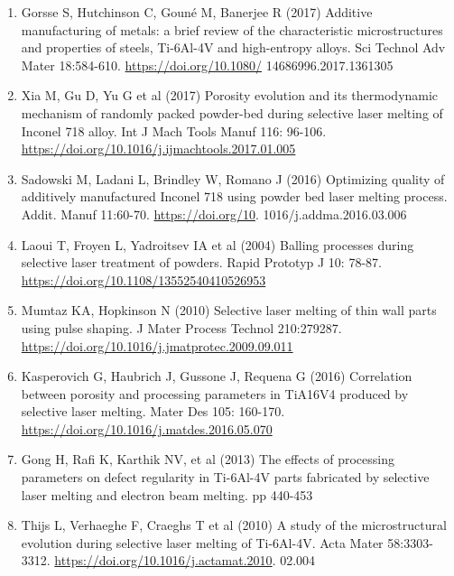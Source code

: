 \documentclass[10pt]{article}
\begin{document}
\begin{enumerate}
  \item Gorsse S, Hutchinson C, Gouné M, Banerjee R (2017) Additive manufacturing of metals: a brief review of the characteristic microstructures and properties of steels, Ti-6Al-4V and high-entropy alloys. Sci Technol Adv Mater 18:584-610. \href{https://doi.org/10.1080/}{https://doi.org/10.1080/} 14686996.2017.1361305

  \item Xia M, Gu D, Yu G et al (2017) Porosity evolution and its thermodynamic mechanism of randomly packed powder-bed during selective laser melting of Inconel 718 alloy. Int J Mach Tools Manuf 116: 96-106. \href{https://doi.org/10.1016/j.ijmachtools.2017.01.005}{https://doi.org/10.1016/j.ijmachtools.2017.01.005}

  \item Sadowski M, Ladani L, Brindley W, Romano J (2016) Optimizing quality of additively manufactured Inconel 718 using powder bed laser melting process. Addit. Manuf 11:60-70. \href{https://doi.org/10}{https://doi.org/10}. 1016/j.addma.2016.03.006

  \item Laoui T, Froyen L, Yadroitsev IA et al (2004) Balling processes during selective laser treatment of powders. Rapid Prototyp J 10: 78-87. \href{https://doi.org/10.1108/13552540410526953}{https://doi.org/10.1108/13552540410526953}

  \item Mumtaz KA, Hopkinson N (2010) Selective laser melting of thin wall parts using pulse shaping. J Mater Process Technol 210:279287. \href{https://doi.org/10.1016/j.jmatprotec.2009.09.011}{https://doi.org/10.1016/j.jmatprotec.2009.09.011}

  \item Kasperovich G, Haubrich J, Gussone J, Requena G (2016) Correlation between porosity and processing parameters in TiA16V4 produced by selective laser melting. Mater Des 105: 160-170. \href{https://doi.org/10.1016/j.matdes.2016.05.070}{https://doi.org/10.1016/j.matdes.2016.05.070}

  \item Gong H, Rafi K, Karthik NV, et al (2013) The effects of processing parameters on defect regularity in Ti-6Al-4V parts fabricated by selective laser melting and electron beam melting. pp 440-453

  \item Thijs L, Verhaeghe F, Craeghs T et al (2010) A study of the microstructural evolution during selective laser melting of Ti-6Al-4V. Acta Mater 58:3303-3312. \href{https://doi.org/10.1016/j.actamat.2010}{https://doi.org/10.1016/j.actamat.2010}. 02.004


\end{enumerate}
\end{document}
